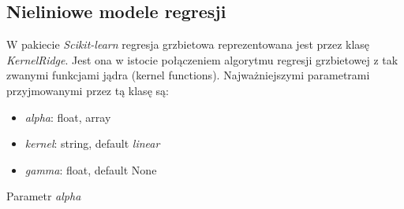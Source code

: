 \subsection{Nieliniowe modele regresji}
W pakiecie \textit{Scikit-learn} regresja grzbietowa reprezentowana jest przez klasę \textit{KernelRidge}.
Jest ona w istocie połączeniem algorytmu regresji grzbietowej z tak zwanymi funkcjami jądra (kernel functions).
Najważniejszymi parametrami przyjmowanymi przez tą klasę są:
\begin{itemize}
 \item \textit{alpha}: {float, array}
 \item \textit{kernel}: string, default \textit{linear}
 \item \textit{gamma}: float, default None
\end{itemize}

Parametr \textit{alpha}

